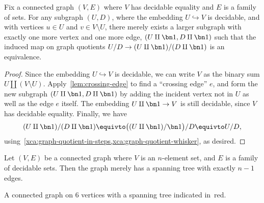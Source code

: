 \begin{lemma}\label{lem:spanning-tree-step}
  Fix a connected graph $(V,E)$ where $V$ has decidable equality and $E$ is a family of sets.
  For any subgraph $(U,D)$, where the embedding $U\hookrightarrow V$ is decidable,
  and with vertices $u \in U$ and $v \in V \setminus U$,
  there merely exists a larger subgraph with exactly one more vertex and one more edge,
  $(U\amalg\bn 1, D\amalg\bn 1)$ such that the induced map on graph quotients
  $U/D \to (U\amalg\bn 1)/(D\amalg\bn 1)$ is an equivalence.
\end{lemma}
\begin{proof}
  Since the embedding $U\hookrightarrow V$ is decidable,
  we can write $V$ as the binary sum $U \amalg (V\setminus U)$.
  Apply~\cref{lem:crossing-edge} to find a ``crossing edge'' $e$,
  and form the new subgraph $(U\amalg\bn 1, D\amalg\bn 1)$ by adding
  the incident vertex not in $U$ as well as the edge $e$ itself.
  The embedding $U\amalg\bn 1 \to V$ is still decidable, since $V$ has decidable equality.
  Finally, we have
  \[
    (U\amalg\bn 1) / (D\amalg\bn 1) \equivto \bigl((U\amalg\bn 1)/\bn 1\bigr)/D
    \equivto U/D,
  \]
  using~\cref{xca:graph-quotient-in-steps,xca:graph-quotient-whisker}, as desired.
\end{proof}

\begin{lemma}\label{lem:spanning-tree}
  Let $(V,E)$ be a connected graph where $V$ is an $n$-element set,
  and $E$ is a family of decidable sets. Then the graph merely has a spanning tree
  with exactly $n-1$ edges.
\end{lemma}

\begin{marginfigure}
  \caption{A connected graph on $6$ vertices with a spanning tree indicated
    in~\textcolor{casred}{red}.}
  \label{fig:spanning-tree-example}
\end{marginfigure}


